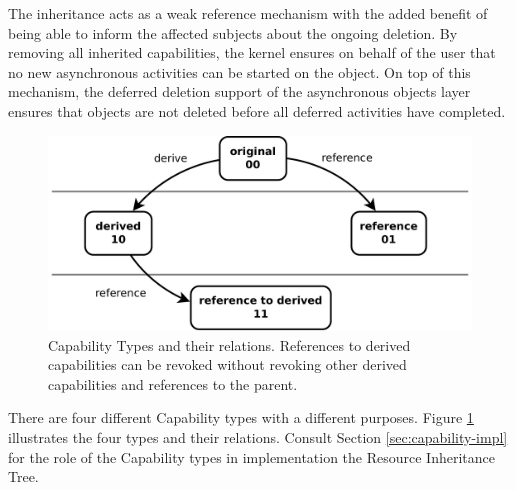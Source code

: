 The inheritance acts as a weak reference mechanism with the added benefit of being able to inform the affected subjects about the ongoing deletion. By removing all inherited capabilities, the kernel ensures on behalf of the user that no new asynchronous activities can be started on the object. On top of this mechanism, the deferred deletion support of the asynchronous objects layer ensures that objects are not deleted before all deferred activities have completed.

\begin{figure}
  \centering
  \includegraphics[scale=0.25]{fig/DerivedReferenceBits.pdf}
  \caption{Capability Types and their relations. References to derived capabilities can be revoked without revoking other derived capabilities and references to the parent.}
  \label{fig:cap-types-sem}
\end{figure}

There are four different Capability types with a different purposes. Figure \ref{fig:cap-types-sem} illustrates the four types and their relations.
Consult Section \ref{sec:capability-impl} for the role of the Capability types in implementation the Resource Inheritance Tree.

